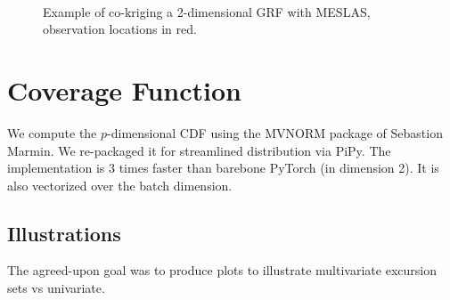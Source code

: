 \documentclass[a4paper,10pt]{article}
\begin{document}
\begin{figure}[tbh!p]
\centering
{}\\
\caption{Example of co-kriging a 2-dimensional GRF with MESLAS, observation locations in red.}
\label{fig:example_inv_prob}
\end{figure}

\newpage

\section{Coverage Function}
We compute the $p$-dimensional CDF using the MVNORM package of Sebastion Marmin. We re-packaged it for streamlined distribution via PiPy. The implementation is $3$ times faster than barebone PyTorch (in dimension 2). It is also vectorized over the batch dimension.

\subsection{Illustrations}
The agreed-upon goal was to produce plots to illustrate multivariate excursion
sets vs univariate.
\end{document}
